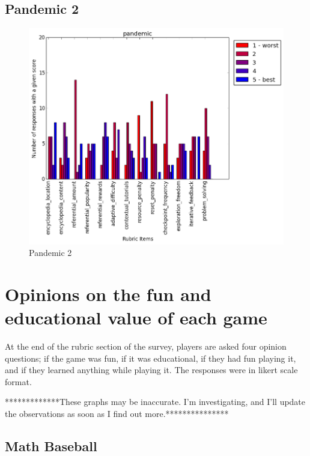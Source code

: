 			\subsection{Pandemic 2}

				\begin{figure}[] 
				\centering 
				\includegraphics[width=\textwidth, height=.4\textheight, keepaspectratio=true]{pandemic_scores.png} 
				\caption{Pandemic 2}
				\end{figure}

			\clearpage

		\section{Opinions on the fun and educational value of each game}

			At the end of the rubric section of the survey, players are asked four opinion questions; if the game was fun, if it was educational, if they had fun playing it, and if they learned anything while playing it. The responses were in likert scale format.

			*************These graphs may be inaccurate. I'm investigating, and I'll update the observations as soon as I find out more.***************

			\subsection{Math Baseball}

